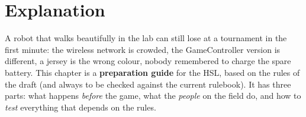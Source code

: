 \label{ch:rc5}

\section*{Explanation}
A robot that walks beautifully in the lab can still lose at a tournament in the first minute: the wireless network is crowded, the GameController version is different, a jersey is the wrong colour, nobody remembered to charge the spare battery. This chapter is a \textbf{preparation guide} for the HSL, based on the rules of the draft (and always to be checked against the current rulebook). It has three parts: what happens \emph{before} the game, what the \emph{people} on the field do, and how to \emph{test} everything that depends on the rules.

